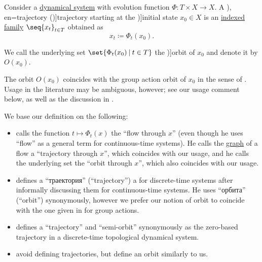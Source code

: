\begin{definition}\label{def:dynamical_system_trajectory}\mimprovised
  Consider a \hyperref[def:dynamical_system]{dynamical system} with evolution function \( \Phi: T \times X \to X \). A \term[ru=траектория (\cite[35]{Юмагулов2015ДинамическиеСистемы}), en=trajectory (\cite[361]{Rozikov2012MultiDimensionalTimeDynamicalSystem})]{trajectory} starting at the \term[ru=начальное состояние (\cite[35]{Юмагулов2015ДинамическиеСистемы})]{initial state} \( x_0 \in X \) is an \hyperref[def:indexed_family]{indexed family} \( \seq{ x_t }_{t \in T} \) obtained as
  \begin{equation*}
    x_t \coloneqq \Phi_t(x_0).
  \end{equation*}

  We call the underlying set \( \set{ \Phi_t(x_0) \given t \in T } \) the \term[en=orbit (\cite[361]{Rozikov2012MultiDimensionalTimeDynamicalSystem})]{orbit} of \( x_0 \) and denote it by \( O(x_0) \).
\end{definition}
\begin{comments}
  \item The orbit \( O(x_0) \) coincides with the group action orbit of \( x_0 \) in the sense of . Usage in the literature may be ambiguous, however; see our usage comment below, as well as the discussion in \cite{MathSE:orbit_and_trajectory_in_dynamical_system}.

  \item We base our definition on the following:
  \begin{itemize}
    \item {} calls the function \( t \mapsto \Phi_t(x) \) the \enquote{flow through \( x \)} (even though he uses \enquote{flow} as a general term for continuous-time systems). He calls the \hyperref[def:set_valued_map/graph]{graph} of a flow a \enquote{trajectory through \( x \)}, which coincides with our usage, and he calls the underlying set the \enquote{orbit through \( x \)}, which also coincides with our usage.

    \item {} defines a \enquote{траектория} (\enquote{trajectory}) a for discrete-time systems after informally discussing them for continuous-time systems. He uses \enquote{орбита} (\enquote{orbit}) synonymously, however we prefer our notion of orbit to coincide with the one given in  for group actions.

    \item {} defines a \enquote{trajectory} and \enquote{semi-orbit} synonymously as the zero-based trajectory in a discrete-time topological dynamical system.

    \item {} avoid defining trajectories, but define an orbit similarly to us.
  \end{itemize}
\end{comments}

